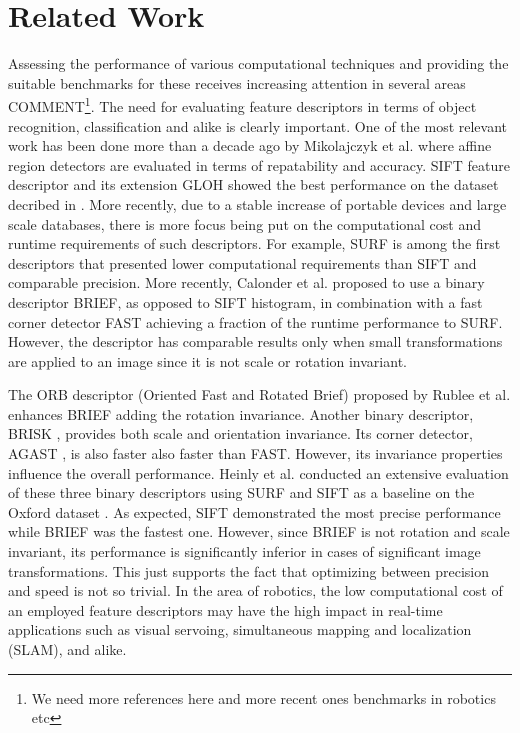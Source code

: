 \section{Related Work}
\label{sec:relatedwork}

Assessing the performance of various computational techniques and providing the suitable benchmarks for these receives increasing attention in several areas  \cite{christensen02} COMMENT\footnote{We need more references here and more recent ones  benchmarks in robotics etc}. The need for evaluating feature descriptors in terms of object recognition, classification and alike is clearly important. One of the most relevant work has been done more than a decade ago by Mikolajczyk et al. \cite{mikolajczyk05} where affine region detectors are evaluated in terms of repatability and accuracy. SIFT feature descriptor \cite{lowe04} and its extension GLOH \cite{mikolajczyk05} showed the best performance on the dataset decribed in \cite{mikolajczyk2005b}. More recently, due to a stable increase of portable devices and large scale databases, there is more focus being 
put on the computational cost and runtime requirements of such descriptors. For example, SURF \cite{bay2008} is among the first descriptors that presented lower computational requirements than SIFT and comparable precision. More recently, Calonder et al. \cite{calonder10} proposed to use a binary descriptor BRIEF, as opposed to SIFT histogram, in combination with a fast corner detector FAST \cite{rosten06} achieving a fraction of the runtime performance to SURF. However, the descriptor has comparable results only when small transformations are applied to an image since it is not scale or rotation invariant. 

The ORB descriptor (Oriented Fast and Rotated Brief) proposed by Rublee et al. \cite{rublee11} enhances BRIEF adding the rotation invariance. Another binary descriptor, BRISK \cite{leutenegger11}, provides both scale and orientation invariance. Its corner detector, AGAST \cite{mair2010}, is also faster also faster than FAST. However, its invariance properties influence the overall performance.
Heinly et al. \cite{heinly2012} conducted an extensive evaluation of these three binary descriptors using SURF and SIFT as a baseline on the Oxford dataset \cite{mikolajczyk2005b}. As expected, SIFT demonstrated the most precise performance while BRIEF was the fastest one. However, since BRIEF is not rotation and scale invariant, its performance is significantly inferior in cases of significant image transformations. This just supports the fact that optimizing between precision and speed is not so trivial.  In the area of robotics, the low computational cost of an employed feature descriptors may have the high impact in real-time applications such as visual servoing, simultaneous mapping and localization (SLAM), and alike. 

